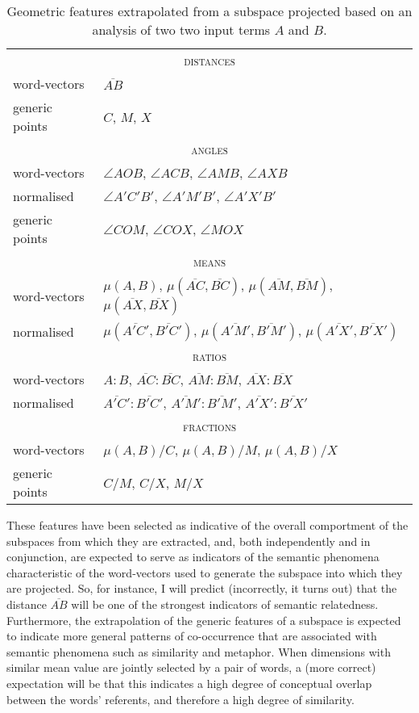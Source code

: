 \begin{table}
\centering
\begin{tabular}{ll}
\hline
\multicolumn{2}{c}{\textsc{distances}} \\
word-vectors & $\overline{AB}$ \\
generic points & $C$, \quad $M$, \quad $X$ \\
\hline
\multicolumn{2}{c}{\textsc{angles}} \\
word-vectors & $\angle AOB$, \quad $\angle ACB$, \quad $\angle AMB$, \quad $\angle AXB$ \\
normalised & $\angle A'C'B'$, \quad $\angle A'M'B'$, \quad $\angle A'X'B'$ \\
generic points & $\angle COM$, \quad $\angle COX$, \quad $\angle MOX$ \\
\hline
\multicolumn{2}{c}{\textsc{means}} \\
word-vectors & $\mu (A,B)$, \quad $\mu (\overline{AC},\overline{BC})$, \quad $\mu (\overline{AM},\overline{BM})$, \quad $\mu (\overline{AX},\overline{BX})$ \\
normalised & $\mu (\overline{A'C'},\overline{B'C'})$, \quad $\mu (\overline{A'M'},\overline{B'M'})$, \quad $\mu (\overline{A'X'},\overline{B'X'})$ \\
\hline
\multicolumn{2}{c}{\textsc{ratios}} \\
word-vectors & $A:B$, \quad $\overline{AC}:\overline{BC}$, \quad $\overline{AM}:\overline{BM}$, \quad $\overline{AX}:\overline{BX}$ \\
normalised & $\overline{A'C'}:\overline{B'C'}$, \quad $\overline{A'M'}:\overline{B'M'}$, \quad $\overline{A'X'}:\overline{B'X'}$ \\
\hline
\multicolumn{2}{c}{\textsc{fractions}} \\
word-vectors & $\mu (A,B)/C$, \quad $\mu (A,B)/M$, \quad $\mu (A,B)/X$ \\
generic points & $C/M$, \quad $C/X$, \quad $M/X$ \\
\hline
\end{tabular}
\caption[Schematic of Geometric Features]{Geometric features extrapolated from a subspace projected based on an analysis of two two input terms $A$ and $B$.}
\label{tab:features}
\end{table}

\noindent These features have been selected as indicative of the overall comportment of the subspaces from which they are extracted, and, both independently and in conjunction, are expected to serve as indicators of the semantic phenomena characteristic of the word-vectors used to generate the subspace into which they are projected.  So, for instance, I will predict (incorrectly, it turns out) that the distance $\overline{AB}$ will be one of the strongest indicators of semantic relatedness.  Furthermore, the extrapolation of the generic features of a subspace is expected to indicate more general patterns of co-occurrence that are associated with semantic phenomena such as similarity and metaphor.  When dimensions with similar mean value are jointly selected by a pair of words, a (more correct) expectation will be that this indicates a high degree of conceptual overlap between the words' referents, and therefore a high degree of similarity.


